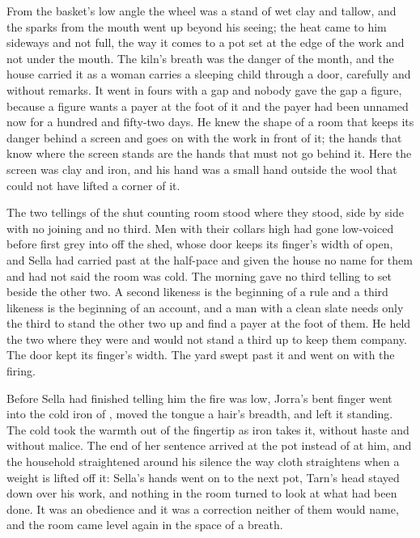 From the basket's low angle the wheel was a stand of wet clay and tallow, and the sparks from the mouth went up beyond his seeing; the heat came to him sideways and not full, the way it comes to a pot set at the edge of the work and not under the mouth. The kiln's breath was the danger of the month, and the house carried it as a woman carries a sleeping child through a door, carefully and without remarks. It went in fours with a gap and nobody gave the gap a figure, because a figure wants a payer at the foot of it and the payer had been unnamed now for a hundred and fifty-two days. He knew the shape of a room that keeps its danger behind a screen and goes on with the work in front of it; the hands that know where the screen stands are the hands that must not go behind it. Here the screen was clay and iron, and his hand was a small hand outside the wool that could not have lifted a corner of it.

The two tellings of the shut counting room stood where they stood, side by side with no joining and no third. Men with their collars high had gone low-voiced before first grey into  off the shed, whose door keeps its finger's width of open, and Sella had carried past at the half-pace and given the house no name for them and had not said the room was cold. The morning gave no third telling to set beside the other two. A second likeness is the beginning of a rule and a third likeness is the beginning of an account, and a man with a clean slate needs only the third to stand the other two up and find a payer at the foot of them. He held the two where they were and would not stand a third up to keep them company. The door kept its finger's width. The yard swept past it and went on with the firing.

\scenebreak

Before Sella had finished telling him the fire was low, Jorra's bent finger went into the cold iron of , moved the tongue a hair's breadth, and left it standing. The cold took the warmth out of the fingertip as iron takes it, without haste and without malice. The end of her sentence arrived at the pot instead of at him, and the household straightened around his silence the way cloth straightens when a weight is lifted off it: Sella's hands went on to the next pot, Tarn's head stayed down over his work, and nothing in the room turned to look at what had been done. It was an obedience and it was a correction neither of them would name, and the room came level again in the space of a breath.

